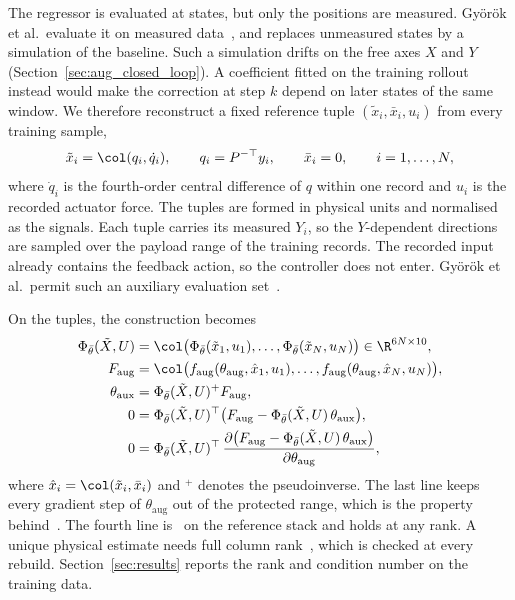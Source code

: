 The regressor is evaluated at states, but only the positions are measured.
Gy\"or\"ok et al.\ evaluate it on measured data~\cite{gyorok2026obc}, and
\cite[Sec.~3]{gyorok2025l4dc} replaces unmeasured states by a simulation of
the baseline.
Such a simulation drifts on the free axes $X$ and $Y$
(Section~\ref{sec:aug_closed_loop}).
A coefficient fitted on the training rollout instead would make the
correction at step $k$ depend on later states of the same window.
We therefore reconstruct a fixed reference tuple
$(\tilde x_i,\bar x_i,u_i)$ from every training sample,
\begin{equation}
 \tilde x_i=\col(q_i,\dot q_i),\qquad q_i=P^{-\top}y_i,\qquad
 \bar x_i=0,\qquad i=1,\dots,N,
\label{eq:obc_tuples}
\end{equation}
where $\dot q_i$ is the fourth-order central difference of $q$ within one
record and $u_i$ is the recorded actuator force.
The tuples are formed in physical units and normalised as the signals.
Each tuple carries its measured $Y_i$, so the $Y$-dependent directions are
sampled over the payload range of the training records.
The recorded input already contains the feedback action, so the controller
does not enter.
Gy\"or\"ok et al.\ permit such an auxiliary evaluation
set~\cite[Sec.~3.2]{gyorok2026obc}.

On the tuples, the construction becomes
\begin{equation}
\begin{aligned}
 \Phi_{\bar\theta}(\tilde X,U)
 &=\col\bigl(\Phi_{\bar\theta}(\tilde x_1,u_1),\dots,
   \Phi_{\bar\theta}(\tilde x_N,u_N)\bigr)\in\R^{6N\times10},\\
 F_{\mathrm{aug}}
 &=\col\bigl(f_{\mathrm{aug}}(\theta_{\mathrm{aug}},\hat x_1,u_1),\dots,
   f_{\mathrm{aug}}(\theta_{\mathrm{aug}},\hat x_N,u_N)\bigr),\\
 \theta_{\mathrm{aux}}&=\Phi_{\bar\theta}(\tilde X,U)^{+}F_{\mathrm{aug}},\\
 0&=\Phi_{\bar\theta}(\tilde X,U)^\top
   \bigl(F_{\mathrm{aug}}-\Phi_{\bar\theta}(\tilde X,U)\,\theta_{\mathrm{aux}}\bigr),\\
 0&=\Phi_{\bar\theta}(\tilde X,U)^\top\,
   \frac{\partial\bigl(F_{\mathrm{aug}}-\Phi_{\bar\theta}(\tilde X,U)\,
   \theta_{\mathrm{aux}}\bigr)}{\partial\theta_{\mathrm{aug}}},
\end{aligned}
\label{eq:obc_ours}
\end{equation}
where $\hat x_i=\col(\tilde x_i,\bar x_i)$ and ${}^{+}$ denotes the
pseudoinverse.
The last line keeps every gradient step of $\theta_{\mathrm{aug}}$ out of the
protected range, which is the property behind~\cite[Eq.~(39)]{gyorok2026obc}.
The fourth line is~\cite[Lemma~3]{gyorok2026obc} on the reference stack and
holds at any rank.
A unique physical estimate needs full column
rank~\cite[Assumption~1]{gyorok2026obc}, which is checked at every rebuild.
Section~\ref{sec:results} reports the rank and condition number on the
training data.

